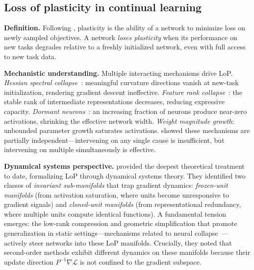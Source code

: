 \documentclass{article}
\newcommand{\cL}{\mathcal{L}}
\begin{document}
\subsection{Loss of plasticity in continual learning}

\textbf{Definition.} Following \citet{lyle2023understanding}, plasticity is the ability of a network to minimize loss on newly sampled objectives. A network \emph{loses plasticity} when its performance on new tasks degrades relative to a freshly initialized network, even with full access to new task data.

\textbf{Mechanistic understanding.} Multiple interacting mechanisms drive LoP. \emph{Hessian spectral collapse}~\citep{lewandowski2024curvature, he2024spectral}: meaningful curvature directions vanish at new-task initialization, rendering gradient descent ineffective. \emph{Feature rank collapse}~\citep{he2024spectral, xu2026forgetting}: the stable rank of intermediate representations decreases, reducing expressive capacity. \emph{Dormant neurons}~\citep{sokar2023dormant}: an increasing fraction of neurons produce near-zero activations, shrinking the effective network width. \emph{Weight magnitude growth}: unbounded parameter growth saturates activations. \citet{lyle2025disentangling} showed these mechanisms are partially independent---intervening on any single cause is insufficient, but intervening on multiple simultaneously is effective.

\textbf{Dynamical systems perspective.} \citet{joudaki2026barriers} provided the deepest theoretical treatment to date, formalizing LoP through dynamical systems theory. They identified two classes of \emph{invariant sub-manifolds} that trap gradient dynamics: \emph{frozen-unit manifolds} (from activation saturation, where units become unresponsive to gradient signals) and \emph{cloned-unit manifolds} (from representational redundancy, where multiple units compute identical functions). A fundamental tension emerges: the low-rank compression and geometric simplification that promote generalization in static settings---mechanisms related to neural collapse~\citep{papyan2020prevalence}---actively steer networks into these LoP manifolds. Crucially, they noted that second-order methods exhibit different dynamics on these manifolds because their update direction $P^{-1}\nabla\cL$ is not confined to the gradient subspace.
\end{document}
